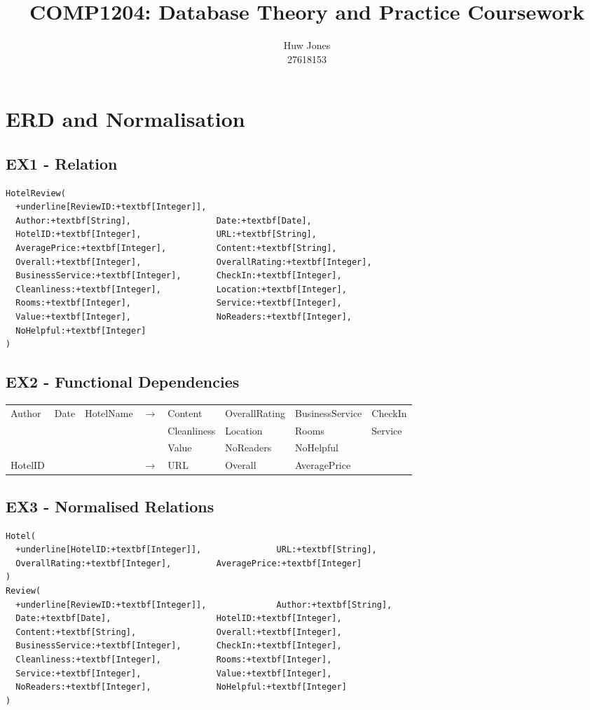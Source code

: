 \documentclass[a4paper]{article}
\author{Huw Jones \\27618153}
\title{COMP1204: Database Theory and Practice Coursework}
\begin{document}
\maketitle
\section{ERD and Normalisation}

%
%
\subsection{EX1 - Relation}
\begin{Verbatim}[commandchars=+\[\]]
HotelReview(
  +underline[ReviewID:+textbf[Integer]],
  Author:+textbf[String],                 Date:+textbf[Date],
  HotelID:+textbf[Integer],               URL:+textbf[String],
  AveragePrice:+textbf[Integer],          Content:+textbf[String],
  Overall:+textbf[Integer],               OverallRating:+textbf[Integer],
  BusinessService:+textbf[Integer],       CheckIn:+textbf[Integer],
  Cleanliness:+textbf[Integer],           Location:+textbf[Integer],
  Rooms:+textbf[Integer],                 Service:+textbf[Integer],
  Value:+textbf[Integer],                 NoReaders:+textbf[Integer],
  NoHelpful:+textbf[Integer]
)
\end{Verbatim}

%
%
\subsection{EX2 - Functional Dependencies}
\begin{tabular}{l l l c l l l l}
Author & Date & HotelName & $\to$ & Content & OverallRating & BusinessService & CheckIn \\
&&&& Cleanliness & Location & Rooms & Service \\
&&&& Value & NoReaders & NoHelpful & \\
HotelID & & & $\to$ & URL & Overall & AveragePrice & \\
\end{tabular}

%
%
\subsection{EX3 - Normalised Relations}
\begin{Verbatim}[commandchars=+\[\]]
Hotel(
  +underline[HotelID:+textbf[Integer]],               URL:+textbf[String],
  OverallRating:+textbf[Integer],         AveragePrice:+textbf[Integer]
)
Review(
  +underline[ReviewID:+textbf[Integer]],              Author:+textbf[String],
  Date:+textbf[Date],                     HotelID:+textbf[Integer],
  Content:+textbf[String],                Overall:+textbf[Integer],
  BusinessService:+textbf[Integer],       CheckIn:+textbf[Integer],
  Cleanliness:+textbf[Integer],           Rooms:+textbf[Integer],
  Service:+textbf[Integer],               Value:+textbf[Integer],
  NoReaders:+textbf[Integer],             NoHelpful:+textbf[Integer]
)
\end{Verbatim}
\end{document}
